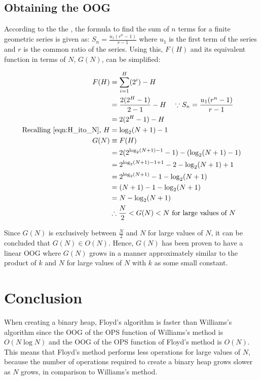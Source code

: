 \documentclass[12pt]{article}
\begin{document}
\subsection{Obtaining the OOG}\label{floyds_OOG}
According to the the \cite{ib}, the formula to find the sum of $n$ terms for a finite geometric series is given as: $S_n=\frac{u_1(r^n-1)}{r-1}$ where $u_1$ is the first term of the series and $r$ is the common ratio of the series. Using this, $F(H)$ and its equivalent function in terms of $N$, $G(N)$, can be simplified:
\vspace{-2em}

\bgroup
\onehalfspacing
\singlespacing
\allowdisplaybreaks
\begin{align*}
    F(H)&=\sum^H_{i=1}(2^i)-H\\
    \phantom{\quad \because S_n=\frac{u_1(r^n-1)}{r-1}}&=\frac{2(2^H-1)}{2-1}-H\quad \because S_n=\frac{u_1(r^n-1)}{r-1}\\
    &=2(2^H-1)-H\\
   \text{Recalling \eqref{eqn:H_ito_N}, }H&=\log_2(N+1)-1\\
    G(N)&\equiv F(H)\\
    &=2(2^{\log_2(N+1)-1}-1)-(\log_2(N+1)-1)\\
    &=2^{\log_2(N+1)-1+1}-2-\log_2(N+1)+1\\
    &=2^{\log_2(N+1)}-1-\log_2(N+1)\\
    &=(N+1)-1-\log_2(N+1)\\
    &=N-\log_2(N+1)\\
    &\therefore \frac{N}{2}<G(N)<N \text{ for large values of } N
\end{align*}
\egroup

Since $G(N)$ is exclusively between $\frac{N}{2}$ and $N$ for large values of $N$, it can be concluded that $G(N)\in O(N)$. Hence, $G(N)$ has been proven to have a linear OOG where $G(N)$ grows in a manner approximately similar to the product of $k$ and $N$ for large values of $N$ with $k$ as some small constant.

\section{Conclusion}\label{conclusion}
When creating a binary heap, Floyd's algorithm is faster than Williams's algorithm since the OOG of the OPS function of Williams's method is $O(N\log{N})$ and the OOG of the OPS function of Floyd's method is $O(N)$. This means that Floyd's method performs less operations for large values of $N$, because the number of operations required to create a binary heap grows slower as $N$ grows, in comparison to Williams's method.\newline
\end{document}
